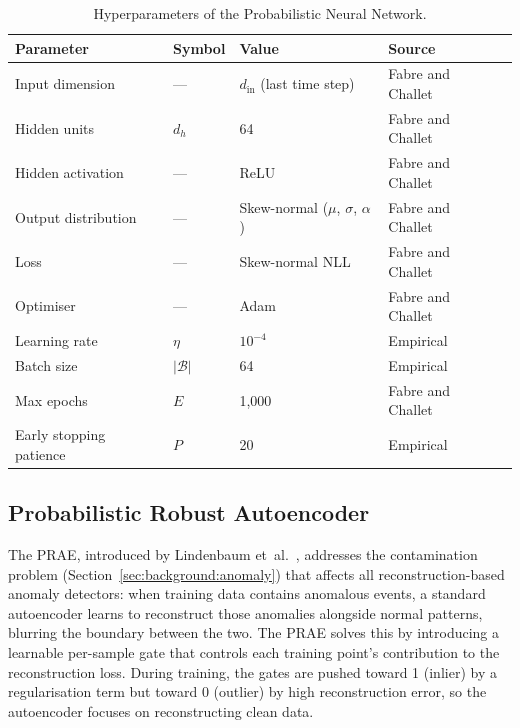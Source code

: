\documentclass[11pt]{report}
\begin{document}
\begin{table}[H]
\centering
\caption{Hyperparameters of the Probabilistic Neural Network.}
\label{tab:pnn_hyperparams}
\begin{tabular}{llll}
\toprule
\textbf{Parameter} & \textbf{Symbol} & \textbf{Value} & \textbf{Source} \\
\midrule
Input dimension & --- & $d_{\text{in}}$ (last time step) & Fabre and Challet~\cite{fabre_2025} \\
Hidden units & $d_h$ & 64 & Fabre and Challet~\cite{fabre_2025} \\
Hidden activation & --- & ReLU & Fabre and Challet~\cite{fabre_2025} \\
Output distribution & --- & Skew-normal ($\mu$, $\sigma$, $\alpha$) & Fabre and Challet~\cite{fabre_2025} \\
Loss & --- & Skew-normal NLL & Fabre and Challet~\cite{fabre_2025} \\
Optimiser & --- & Adam & Fabre and Challet~\cite{fabre_2025} \\
Learning rate & $\eta$ & $10^{-4}$ & Empirical \\
Batch size & $|\mathcal{B}|$ & 64 & Empirical \\
Max epochs & $E$ & 1{,}000 & Fabre and Challet~\cite{fabre_2025} \\
Early stopping patience & $P$ & 20 & Empirical \\
\bottomrule
\end{tabular}
\end{table}


\subsection{Probabilistic Robust Autoencoder}\label{subsec:models:prae}

The PRAE, introduced by Lindenbaum et~al.~\cite{lindenbaum2022prae}, addresses the contamination problem (Section~\ref{sec:background:anomaly}) that affects all reconstruction-based anomaly detectors: when training data contains anomalous events, a standard autoencoder learns to reconstruct those anomalies alongside normal patterns, blurring the boundary between the two. The PRAE solves this by introducing a learnable per-sample gate that controls each training point's contribution to the reconstruction loss. During training, the gates are pushed toward 1 (inlier) by a regularisation term but toward 0 (outlier) by high reconstruction error, so the autoencoder focuses on reconstructing clean data.
\end{document}
